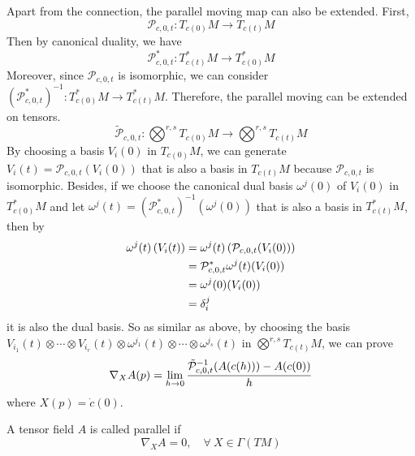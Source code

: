 \begin{enumerate}[label=\arabic{*}.]
	\noindent Apart from the connection, the parallel moving map can also be extended. First,
	\begin{equation*}
		\mathcal{P}_{c,0,t} \colon T_{c(0)}M \longrightarrow T_{c(t)}M
	\end{equation*}
	Then by canonical duality, we have
	\begin{equation*}
		\mathcal{P}_{c,0,t}^* \colon T_{c(t)}^*M \longrightarrow T_{c(0)}^*M
	\end{equation*}
	Moreover, since $\mathcal{P}_{c,0,t}$ is isomorphic, we can consider $(\mathcal{P}_{c,0,t}^*)^{-1} \colon T_{c(0)}^*M \longrightarrow T_{c(t)}^*M$. Therefore, the parallel moving can be extended on tensors.
	\begin{equation*}
		\tilde{\mathcal{P}}_{c,0,t} \colon \bigotimes^{r,s} T_{c(0)}M \longrightarrow \bigotimes^{r,s} T_{c(t)}M
	\end{equation*}
	By choosing a basis $V_i(0)$ in $T_{c(0)}M$, we can generate $V_i(t) = \mathcal{P}_{c,0,t}(V_i(0))$ that is also a basis in $T_{c(t)}M$ because $\mathcal{P}_{c,0,t}$ is isomorphic. Besides, if we choose the canonical dual basis $\omega^j(0)$ of $V_i(0)$ in $T_{c(0)}^*M$ and let $\omega^j(t) = (\mathcal{P}_{c,0,t}^*)^{-1}(\omega^j(0))$ that is also a basis in $T_{c(t)}^*M$, then by
	\begin{equation*}
		\begin{aligned}
			\omega^j(t)\left(V_i(t)\right) &= \omega^j(t)\left(\mathcal{P}_{c,0,t}(V_i(0))\right) \\
			&= \mathcal{P}_{c,0,t}^*\omega^j(t)(V_i(0)) \\
			&= \omega^j(0)(V_i(0)) \\
			&= \delta_i^j
		\end{aligned}
	\end{equation*}
	it is also the dual basis. So as similar as above, by choosing the basis $V_{i_1}(t)\otimes \cdots \otimes V_{i_r}(t)\otimes \omega^{j_1}(t)\otimes \cdots \otimes \omega^{j_s}(t)$ in $\bigotimes^{r,s} T_{c(t)}M$, we can prove
	\begin{equation*}
		\nabla_XA(p) = \lim_{h \rightarrow 0} \frac{\tilde{\mathcal{P}}_{c,0,t}^{-1}(A(c(h))) - A(c(0))}{h}
	\end{equation*}
	where $X(p) = \dot{c}(0)$.
	\begin{defn}
		A tensor field $A$ is called parallel if 
		\begin{equation*}
			\nabla_XA = 0,\quad \forall~X \in \Gamma(TM)
		\end{equation*}
	\end{defn}


\end{enumerate}
